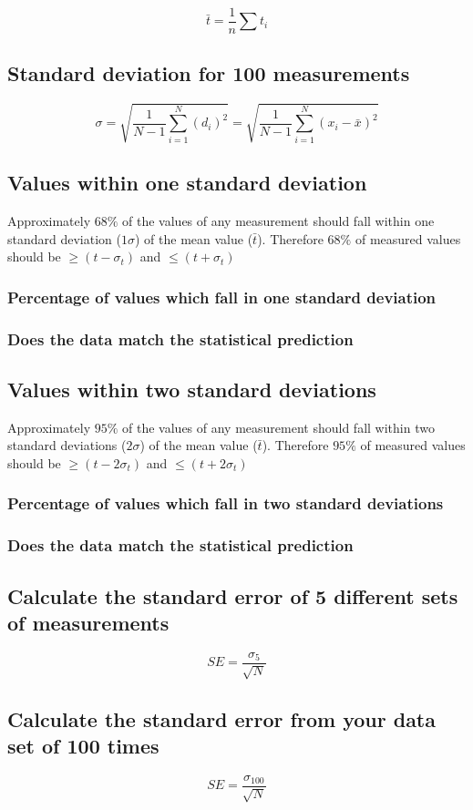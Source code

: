 \documentclass[11pt, letterpaper, includehead]{article}
\begin{document}
$$\bar{t} = \frac{1}{n}\sum t_i$$

\subsection{Standard deviation for 100 measurements} %

$$\sigma = \sqrt{\frac{1}{N - 1}\sum_{i = 1}^{N} (d_i)^2} = \sqrt{\frac{1}{N - 1}\sum_{i = 1}^{N} (x_i - \bar{x})^2}$$

\subsection{Values within one standard deviation} %
Approximately $68\%$ of the values of any measurement should fall within one
standard deviation ($1 \sigma$) of the mean value ($\bar{t}$). Therefore $68\%$ of measured
values should be $\geq (t - \sigma_t)$ and $\leq (t + \sigma_t)$

\subsubsection{Percentage of values which fall in one standard deviation}

\subsubsection{Does the data match the statistical prediction}

\subsection{Values within two standard deviations} %
Approximately $95\%$ of the values of any measurement should fall within two
standard deviations ($2 \sigma$) of the mean value ($\bar{t}$). Therefore $95\%$ of measured
values should be $\geq (t - 2 \sigma_t)$ and $\leq (t + 2 \sigma_t)$

\subsubsection{Percentage of values which fall in two standard deviations}

\subsubsection{Does the data match the statistical prediction}

\subsection{Calculate the standard error of 5 different sets of measurements}

$$SE = \frac{\sigma_{5}}{\sqrt{N}}$$

\subsection{Calculate the standard error from your data set of 100 times}

$$SE = \frac{\sigma_{100}}{\sqrt{N}}$$
\end{document}
